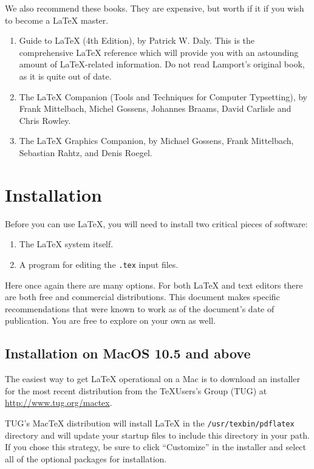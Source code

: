 We also recommend these books. They are expensive, but worth if it if
you wish to become a \LaTeX{} master.
\begin{enumerate}
\item Guide to \LaTeX{} (4th Edition), by Patrick W. Daly. This is the
  comprehensive \LaTeX{} reference which will provide you with an
  astounding amount of \LaTeX-related information. Do not read
  Lamport's original book, as it is quite out of date.
\item The \LaTeX{} Companion (Tools and Techniques for Computer
  Typsetting), by Frank Mittelbach, Michel Gossens, Johannes Braams,
  David Carlisle and Chris Rowley.
\item The \LaTeX{} Graphics Companion, by Michael Gossens, Frank
  Mittelbach, Sebastian Rahtz, and Denis Roegel.
\end{enumerate}

\section{Installation}
Before you can use \LaTeX{}, you will need to install two critical
pieces of software:
\begin{enumerate}
\item The \LaTeX{} system itself.
\item A program for editing the \verb+.tex+ input files.
\end{enumerate}

Here once again there are many options. For both \LaTeX{}
and text editors there are both free  and commercial
distributions. This document makes specific recommendations that were
known to work as of the document's date of publication. You are free
to explore on your own as well.

\subsection{Installation on MacOS 10.5 and above}

The easiest way to get \LaTeX{} operational on a Mac is
 to download an installer for the most recent distribution
 from the \TeX Users's Group (TUG) at \url{http://www.tug.org/mactex}. 

TUG's Mac\TeX{} distribution will install \LaTeX{} in the
\verb+/usr/texbin/pdflatex+ directory and will update your startup files to
include this directory in your path. If you chose this strategy, be
sure to click ``Customize'' in the installer and select  all of
the optional packages for installation.

